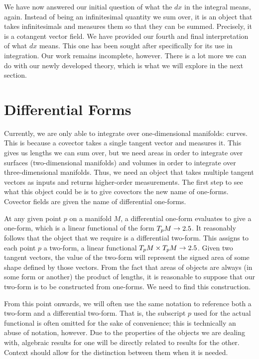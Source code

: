 \documentclass[a4paper,12pt]{article}
\begin{document}
We have now answered our initial question of what the $dx$ in the integral means, again.
Instead of being an infinitesimal quantity we sum over, it is an object that takes infinitesimals and measures them so that they can be summed.
Precisely, it is a cotangent vector field.
We have provided our fourth and final interpretation of what $dx$ means.
This one has been sought after specifically for its use in integration.
Our work remains incomplete, however.
There is a lot more we can do with our newly developed theory, which is what we will explore in the next section.

\section{Differential Forms}

Currently, we are only able to integrate over one-dimensional manifolds: curves.
This is because a covector takes a single tangent vector and measures it.
This gives us lengths we can sum over, but we need areas in order to integrate over surfaces (two-dimensional manifolds) and volumes in order to integrate over three-dimensional manifolds.
Thus, we need an object that takes multiple tangent vectors as inputs and returns higher-order measurements.
The first step to see what this object could be is to give covectors the new name of one-forms.
Covector fields are given the name of differential one-forms.

At any given point $p$ on a manifold $M$, a differential one-form evaluates to give a one-form, which is a linear functional of the form $T_p M \to 2.5$.
It reasonably follows that the object that we require is a differential two-form.
This assigns to each point $p$ a two-form, a linear functional $T_p M \times T_p M \to 2.5$.
Given two tangent vectors, the value of the two-form will represent the signed area of some shape defined by those vectors.
From the fact that areas of objects are always (in some form or another) the product of lengths, it is reasonable to suppose that our two-form is to be constructed from one-forms.
We need to find this construction.

From this point onwards, we will often use the same notation to reference both a two-form and a differential two-form.
That is, the subscript $p$ used for the actual functional is often omitted for the sake of convenience; this is technically an abuse of notation, however.
Due to the properties of the objects we are dealing with, algebraic results for one will be directly related to results for the other.
Context should allow for the distinction between them when it is needed.
\end{document}

